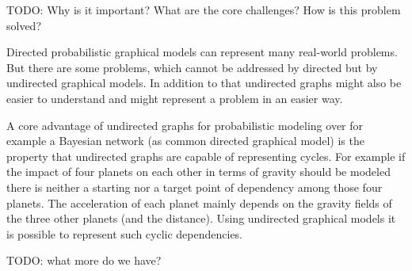 TODO:  Why is it important? What are the core challenges? How is this problem solved?

Directed probabilistic graphical models can represent many real-world problems. But there are some problems, which cannot be addressed by directed but by undirected graphical models. In addition to that undirected graphs might also be easier to understand and might represent a problem in an easier way.

A core advantage of undirected graphs for probabilistic modeling over for example a Bayesian network (as common directed graphical model) is the property that undirected graphs are capable of representing cycles. For example if the impact of four planets on each other in terms of gravity should be modeled there is neither a starting nor a target point of dependency among those four planets. The acceleration of each planet mainly depends on the gravity fields of the three other planets (and the distance). Using undirected graphical models it is possible to represent such cyclic dependencies.

TODO: what more do we have?
